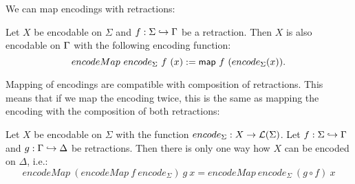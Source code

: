 We can map encodings with retractions:
\begin{definition}
  \label{def:Encode_map}
  Let $X$ be encodable on $\Sigma$ and $f : \Sigma \hookrightarrow \Gamma$ be a retraction.  Then $X$ is also encodable on $\Gamma$ with the following
  encoding function:
  \[ encodeMap~encode_\Sigma~f~(x) := \mathsf{map}~f~(encode_\Sigma(x)). \]
\end{definition}

Mapping of encodings are compatible with composition of retractions.  This means that if we map the encoding twice, this is the same as mapping the
encoding with the composition of both retractions:
\begin{lemma}
  \label{lem:Encode_map_comp}
  Let $X$ be encodable on $\Sigma$ with the function $encode_\Sigma : X \rightarrow \mathcal{L}(\Sigma)$.  Let $f : \Sigma \hookrightarrow \Gamma$ and
  $g : \Gamma \hookrightarrow \Delta$ be retractions.  Then there is only one way how $X$ can be encoded on $\Delta$, i.e.:
  \[
    encodeMap~(encodeMap~f~encode_\Sigma)~g~x = encodeMap~encode_\Sigma~(g \circ f)~x
  \]
\end{lemma}

